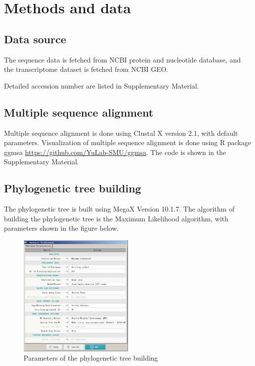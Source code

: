 \section{Methods and data}

\subsection{Data source}
The sequence data is fetched from NCBI protein and nucleotide database, and the transcriptome dataset is fetched from NCBI GEO.

Detailed accession number are listed in Supplementary Material.

\subsection{Multiple sequence alignment}

Multiple sequence alignment is done using Clustal X version 2.1, with default parameters.
Visualization of multiple sequence alignment is done using R package ggmsa \url{https://github.com/YuLab-SMU/ggmsa}. The code is shown in the Supplementary Material.

\subsection{Phylogenetic tree building}
The phylogenetic tree is built using MegaX Version 10.1.7. The algorithm of building the phylogenetic tree is the Maximum Likelihood algorithm, with parameters shown in the figure below.

\begin{figure}[H]
    \centering
    \includegraphics[width=0.5\textwidth]{image/MEGAX.png}
    \caption{Parameters of the phylogenetic tree building}
    \label{MEGAX}
\end{figure}


